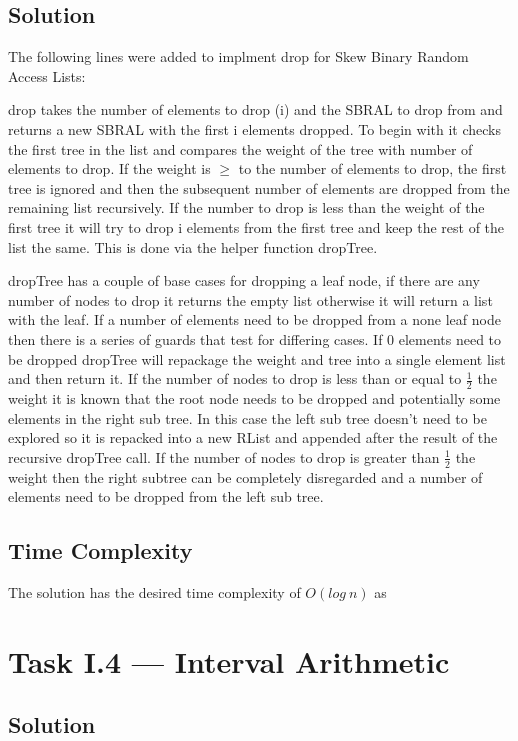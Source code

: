 \documentclass[a4paper]{article}
\begin{document}
\subsection{Solution}
The following lines were added to implment drop for Skew Binary Random Access Lists:

\par
drop takes the number of elements to drop (i) and the SBRAL to drop from and returns a new SBRAL with the first i elements dropped.
To begin with it checks the first tree in the list and compares the weight of the tree with number of elements to drop.
If the weight is \( \geq \) to the number of elements to drop, the first tree is ignored and then the subsequent number of elements are dropped from the remaining list recursively.
If the number to drop is less than the weight of the first tree it will try to drop i elements from the first tree and keep the rest of the list the same.
This is done via the helper function dropTree.
\par
dropTree has a couple of base cases for dropping a leaf node, if there are any number of nodes to drop it returns the empty list otherwise it will return a list with the leaf.
If a number of elements need to be dropped from a none leaf node then there is a series of guards that test for differing cases.
If 0 elements need to be dropped dropTree will repackage the weight and tree into a single element list and then return it.
If the number of nodes to drop is less than or equal to \( \frac{1}{2} \) the weight it is known that the root node needs to be dropped and potentially some elements in the right sub tree.
In this case the left sub tree doesn't need to be explored so it is repacked into a new RList and appended after the result of the recursive dropTree call.
If the number of nodes to drop is greater than \( \frac{1}{2} \) the weight then the right subtree can be completely disregarded and a number of elements need to be dropped from the left sub tree.

\subsection{Time Complexity}
The solution has the desired time complexity of \( O(log\ n) \) as

\section{Task I.4 --- Interval Arithmetic}
\subsection{Solution}
\end{document}
